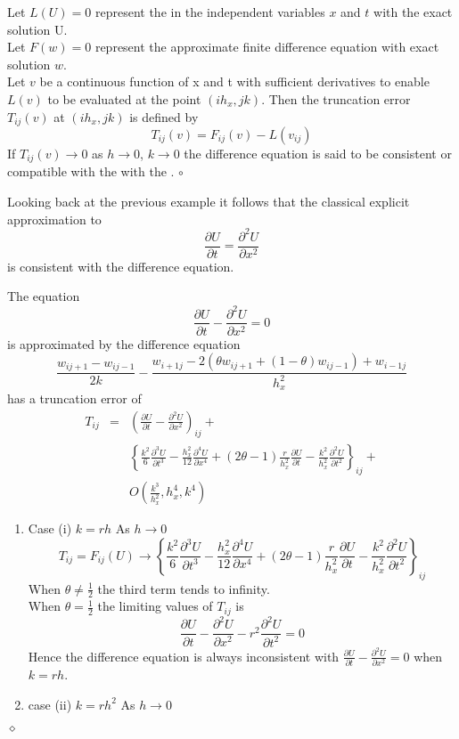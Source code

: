 \begin{definition}
Let $L(U)=0$ represent the  in the independent variables $x$ and $t$ with
the exact solution U.\\
Let $F(w)=0$ represent the approximate finite difference equation with exact 
solution $w$.\\
Let $v$ be a continuous function of x and t with sufficient derivatives to enable
$L(v)$ to be evaluated at the point $(ih_x,jk)$.  Then the truncation error $T_{ij}(v)$ at $ (ih_x,jk)$ is defined by
\[T_{ij}(v)=F_{ij}(v)-L(v_{ij})\]
If $T_{ij}(v) \rightarrow 0$ as $h \rightarrow 0$,  $k \rightarrow 0$
the difference equation is said to be consistent or compatible with the with the .
$\circ$
\end{definition}
Looking back at the previous example it follows that the classical explicit approximation to 
\[\frac{\partial U}{\partial t} = \frac{\partial^2 U}{\partial x^2} \]
is consistent with the difference equation.
\begin{example}
The equation
\[\frac{\partial U}{\partial t} - \frac{\partial^2 U}{\partial x^2}=0 \]
is approximated by the difference equation
\[ \frac{w_{ij+1}-w_{ij-1}}{2k}-\frac{w_{i+1j}-2(\theta w_{ij+1}+(1-\theta)w_{ij-1})+w_{i-1j}}{h_x^2}\]
has a truncation error of 
\begin{eqnarray*}
T_{ij}&=&\left(\frac{\partial U}{\partial t} - \frac{\partial^2 U}{\partial x^2} \right)_{ij}+\\
& &
\left\{\frac{k^2}{6}\frac{\partial^3 U}{\partial t^3} 
-\frac{h_x^2}{12}\frac{\partial^4 U}{\partial x^4} 
	+(2\theta-1)\frac{r}{h_x^2}\frac{\partial U}{\partial t} 
-\frac{k^2}{h_x^2}\frac{\partial^2 U}{\partial t^2} \right\}_{ij}+\\
& & O(\frac{k^3}{h_x^2},h_x^4,k^4)
\end{eqnarray*}
\begin{enumerate}
\item{Case (i)}
$k=rh$  As $h\rightarrow 0$
\[
T_{ij}=F_{ij}(U) \rightarrow 
\left\{\frac{k^2}{6}\frac{\partial^3 U}{\partial t^3} 
-\frac{h_x^2}{12}\frac{\partial^4 U}{\partial x^4} 
	+(2\theta-1)\frac{r}{h_x^2}\frac{\partial U}{\partial t} 
-\frac{k^2}{h_x^2}\frac{\partial^2 U}{\partial t^2} \right\}_{ij}
\]
When $\theta\not=\frac{1}{2}$ the third term tends to infinity.\\
When $\theta=\frac{1}{2}$ the limiting values of $T_{ij}$ is 
\[
\frac{\partial U}{\partial t} - \frac{\partial^2 U}{\partial x^2} -r^2\frac{\partial^2 U}{\partial t^2 }=0
\]
Hence the difference equation is always inconsistent with $\frac{\partial U}{\partial t} - \frac{\partial^2 U}{\partial x^2}=0 $ when $k=rh$.
\item{case (ii)}
$k=rh^2$  As $h\rightarrow 0$
\end{enumerate}
$\diamond$
\end{example}
